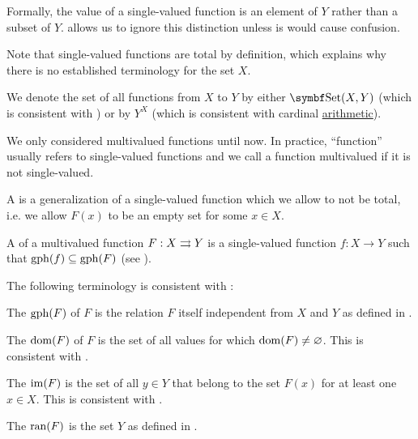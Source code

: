 \begin{definition}
\begin{DefEnum}[series=def:function]
    Formally, the value of a single-valued function is an element of \( Y \) rather than a subset of \( Y \).  allows us to ignore this distinction unless is would cause confusion.

    Note that single-valued functions are total by definition, which explains why there is no established terminology for the set \( X \).

    We denote the set of all functions from \( X \) to \( Y \) by either \( \Cat{Set}(X, Y) \) (which is consistent with ) or by \( Y^X \) (which is consistent with cardinal \hyperref[def:cardinal_arithmetic]{arithmetic}).

     We only considered multivalued functions until now. In practice, \enquote{function} usually refers to single-valued functions and we call a function multivalued if it is not single-valued.

     A  is a generalization of a single-valued function which we allow to not be total, i.e. we allow \( F(x) \) to be an empty set for some \( x \in X \).

     A  of a multivalued function \( F: X \rightrightarrows Y \) is a single-valued function \( f: X \to Y \) such that \( \operatorname{gph}(f) \subseteq \operatorname{gph}(F) \) (see ).
  \end{DefEnum}

  The following terminology is consistent with :
  \begin{DefEnum}[resume=def:function]
     The  \( \operatorname{gph}(F) \) of \( F \) is the relation \( F \) itself independent from \( X \) and \( Y \) as defined in .

     The  \( \operatorname{dom}(F) \) of \( F \) is the set of all values for which \( \operatorname{dom}(F) \neq \varnothing \). This is consistent with .

     The  \( \operatorname{im}(F) \) is the set of all \( y \in Y \) that belong to the set \( F(x) \) for at least one \( x \in X \). This is consistent with .

     The  \( \operatorname{ran}(F) \) is the set \( Y \) as defined in .


\end{DefEnum}
\end{definition}
